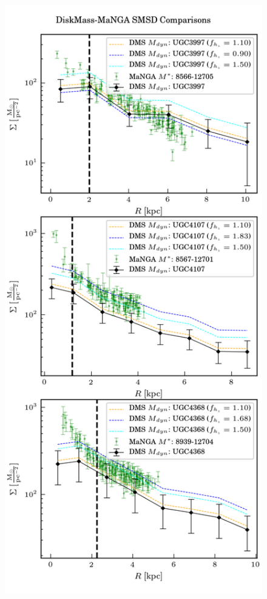 \begin{figure}
    \centering
    \includegraphics[height=0.8\textheight]{dms_compare}

\end{figure}
